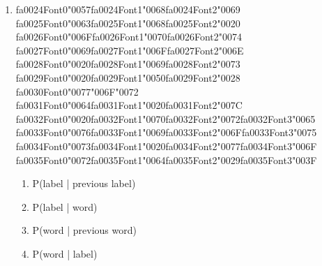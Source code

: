 \documentclass[12pt]{article}
\begin{document}
\begin{enumerate}[label=Q\arabic*.]
\begin{enumerate}[label=(\Alph*)]
    \item It models emissions P(word | label)
\end{enumerate}
\item {\csname fa0024Font0\endcsname\char"0057}{\csname fa0024Font1\endcsname\char"0068}{\csname fa0024Font2\endcsname\char"0069} {\csname fa0025Font0\endcsname\char"0063}{\csname fa0025Font1\endcsname\char"0068}{\csname fa0025Font2\endcsname\char"0020} {\csname fa0026Font0\endcsname\char"006F}{\csname fa0026Font1\endcsname\char"0070}{\csname fa0026Font2\endcsname\char"0074} {\csname fa0027Font0\endcsname\char"0069}{\csname fa0027Font1\endcsname\char"006F}{\csname fa0027Font2\endcsname\char"006E} {\csname fa0028Font0\endcsname\char"0020}{\csname fa0028Font1\endcsname\char"0069}{\csname fa0028Font2\endcsname\char"0073} {\csname fa0029Font0\endcsname\char"0020}{\csname fa0029Font1\endcsname\char"0050}{\csname fa0029Font2\endcsname\char"0028} {\csname fa0030Font0\endcsname\char"0077}{\char"006F}{\char"0072} {\csname fa0031Font0\endcsname\char"0064}{\csname fa0031Font1\endcsname\char"0020}{\csname fa0031Font2\endcsname\char"007C} {\csname fa0032Font0\endcsname\char"0020}{\csname fa0032Font1\endcsname\char"0070}{\csname fa0032Font2\endcsname\char"0072}{\csname fa0032Font3\endcsname\char"0065} {\csname fa0033Font0\endcsname\char"0076}{\csname fa0033Font1\endcsname\char"0069}{\csname fa0033Font2\endcsname\char"006F}{\csname fa0033Font3\endcsname\char"0075} {\csname fa0034Font0\endcsname\char"0073}{\csname fa0034Font1\endcsname\char"0020}{\csname fa0034Font2\endcsname\char"0077}{\csname fa0034Font3\endcsname\char"006F} {\csname fa0035Font0\endcsname\char"0072}{\csname fa0035Font1\endcsname\char"0064}{\csname fa0035Font2\endcsname\char"0029}{\csname fa0035Font3\endcsname\char"003F}
\begin{enumerate}[label=(\Alph*)]
    \item P(label | previous label)
    \item P(label | word)
    \item P(word | previous word)
    \item P(word | label)
\end{enumerate}

\end{enumerate}
\end{document}
